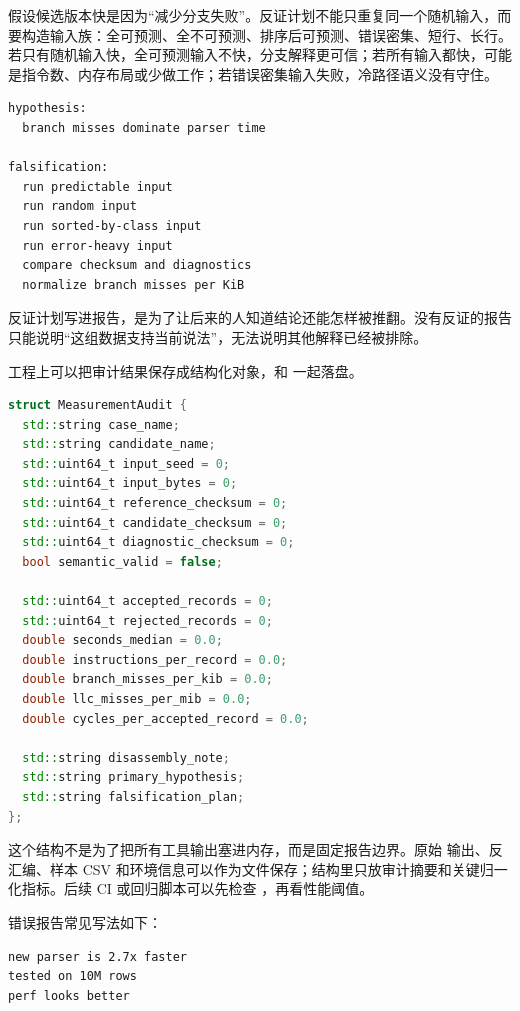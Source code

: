 假设候选版本快是因为“减少分支失败”。反证计划不能只重复同一个随机输入，而要构造输入族：全可预测、全不可预测、排序后可预测、错误密集、短行、长行。若只有随机输入快，全可预测输入不快，分支解释更可信；若所有输入都快，可能是指令数、内存布局或少做工作；若错误密集输入失败，冷路径语义没有守住。

\begin{lstlisting}[numbers=none,caption={候选解释和反证实验}]
hypothesis:
  branch misses dominate parser time

falsification:
  run predictable input
  run random input
  run sorted-by-class input
  run error-heavy input
  compare checksum and diagnostics
  normalize branch misses per KiB
\end{lstlisting}

反证计划写进报告，是为了让后来的人知道结论还能怎样被推翻。没有反证的报告只能说明“这组数据支持当前说法”，无法说明其他解释已经被排除。

工程上可以把审计结果保存成结构化对象，和  一起落盘。

\begin{lstlisting}[language=C++,caption={MeasurementAudit 保存语义和机器证据}]
struct MeasurementAudit {
  std::string case_name;
  std::string candidate_name;
  std::uint64_t input_seed = 0;
  std::uint64_t input_bytes = 0;
  std::uint64_t reference_checksum = 0;
  std::uint64_t candidate_checksum = 0;
  std::uint64_t diagnostic_checksum = 0;
  bool semantic_valid = false;

  std::uint64_t accepted_records = 0;
  std::uint64_t rejected_records = 0;
  double seconds_median = 0.0;
  double instructions_per_record = 0.0;
  double branch_misses_per_kib = 0.0;
  double llc_misses_per_mib = 0.0;
  double cycles_per_accepted_record = 0.0;

  std::string disassembly_note;
  std::string primary_hypothesis;
  std::string falsification_plan;
};
\end{lstlisting}

这个结构不是为了把所有工具输出塞进内存，而是固定报告边界。原始  输出、反汇编、样本 CSV 和环境信息可以作为文件保存；结构里只放审计摘要和关键归一化指标。后续 CI 或回归脚本可以先检查 ，再看性能阈值。

错误报告常见写法如下：

\begin{lstlisting}[numbers=none,caption={不可接受的性能结论}]
new parser is 2.7x faster
tested on 10M rows
perf looks better
\end{lstlisting}

